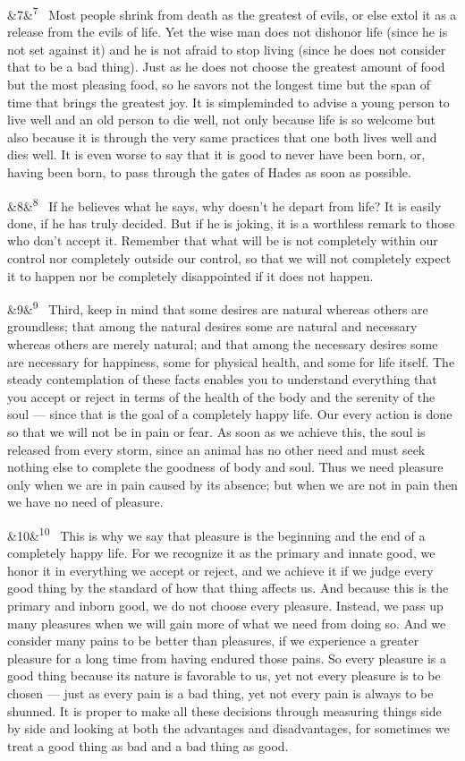 \documentclass[12pt]{article}
\newcommand{\para}[1][]{\par\noindent\ifx&#1&\else\textsuperscript{\footnotesize #1}~\fi}
\begin{document}
\para[7] Most people shrink from death as the greatest of evils, or else extol it as a release from the evils of life. Yet the wise man does not dishonor life (since he is not set against it) and he is not afraid to stop living (since he does not consider that to be a bad thing). Just as he does not choose the greatest amount of food but the most pleasing food, so he savors not the longest time but the span of time that brings the greatest joy. It is simpleminded to advise a young person to live well and an old person to die well, not only because life is so welcome but also because it is through the very same practices that one both lives well and dies well. It is even worse to say that it is good to never have been born, or, having been born, to pass through the gates of Hades as soon as possible.

\para[8] If he believes what he says, why doesn't he depart from life? It is easily done, if he has truly decided. But if he is joking, it is a worthless remark to those who don't accept it. Remember that what will be is not completely within our control nor completely outside our control, so that we will not completely expect it to happen nor be completely disappointed if it does not happen.

\para[9] Third, keep in mind that some desires are natural whereas others are groundless; that among the natural desires some are natural and necessary whereas others are merely natural; and that among the necessary desires some are necessary for happiness, some for physical health, and some for life itself. The steady contemplation of these facts enables you to understand everything that you accept or reject in terms of the health of the body and the serenity of the soul --- since that is the goal of a completely happy life. Our every action is done so that we will not be in pain or fear. As soon as we achieve this, the soul is released from every storm, since an animal has no other need and must seek nothing else to complete the goodness of body and soul. Thus we need pleasure only when we are in pain caused by its absence; but when we are not in pain then we have no need of pleasure.

\para[10] This is why we say that pleasure is the beginning and the end of a completely happy life. For we recognize it as the primary and innate good, we honor it in everything we accept or reject, and we achieve it if we judge every good thing by the standard of how that thing affects us. And because this is the primary and inborn good, we do not choose every pleasure. Instead, we pass up many pleasures when we will gain more of what we need from doing so. And we consider many pains to be better than pleasures, if we experience a greater pleasure for a long time from having endured those pains. So every pleasure is a good thing because its nature is favorable to us, yet not every pleasure is to be chosen --- just as every pain is a bad thing, yet not every pain is always to be shunned. It is proper to make all these decisions through measuring things side by side and looking at both the advantages and disadvantages, for sometimes we treat a good thing as bad and a bad thing as good.
\end{document}
